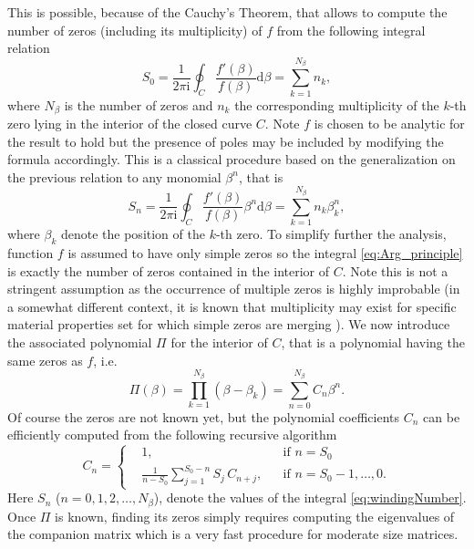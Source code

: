 \documentclass[a4paper,10pt]{article}
\newcommand{\ud}{\mathrm{d}}
\renewcommand{\i}{\mathrm{i}}
\begin{document}
This is possible, because of the Cauchy's Theorem, that allows to compute the number of zeros (including its multiplicity) of $f$  from the following integral relation
\begin{equation}
    \label{eq:Arg_principle}
 S_0 = \frac{1}{2\pi \i} \oint_C \frac{f'(\beta)}{f(\beta)}  \ud \beta =
 \sum_{k=1}^{N_\beta} n_{k},
\end{equation}
where $N_\beta$ is the number of zeros and $n_{k}$ the corresponding multiplicity of the $k$-th
zero lying in the interior of the closed curve $C$. Note $f$ is chosen to be analytic
for the result to hold but the presence of poles may be included
by modifying the formula accordingly.
This is a classical procedure based
on the generalization on the previous relation to any monomial $\beta^n$, that is
~\cite{Kravanja:2000}
\begin{equation}
    \label{eq:windingNumber}
S_n = \frac{1}{2\pi \i} \oint_C \frac{f'(\beta)}{f(\beta)} \beta^n \ud \beta =
 \sum_{k=1}^{N_\beta} n_{k} \beta_{k}^n,
\end{equation}
where $\beta_{k}$ denote the position of the $k$-th zero.
To simplify further the analysis, function $f$ is assumed to
have only simple zeros so the integral \eqref{eq:Arg_principle} is exactly the number of zeros contained in the interior of $C$. Note this is not a stringent assumption as the occurrence of multiple zeros is highly improbable
(in a somewhat different context, it is known that multiplicity may exist
for specific material properties set for which simple zeros are merging \cite{Nilsson:1980,Bloch3D:20107}).
We now introduce the associated polynomial $\Pi$ for the interior of $C$, that is
a polynomial having the same zeros as $f$, i.e.
\begin{equation}
\label{eq:Pi}
    \Pi(\beta) = \prod_{k=1}^{N_\beta} ( \beta - \beta_{k}) = \sum_{n=0}^{N_\beta} C_n \beta^n.
\end{equation}
Of course the zeros are not known yet, but the polynomial coefficients $C_n$
can be efficiently computed from the following recursive algorithm~\cite{Cristini:1994,Chen:2000}
\begin{equation}
    \label{eq:Cn}
    C_n = \left\{ \begin{aligned}
    &1, &        & \text{if } n=S_0\\
  &\frac{1}{n-S_0}\sum_{j=1}^{S_0-n} S_j \,  C_{n+j},     &   & \text{if } n = S_0-1, \ldots, 0.
    \end{aligned} \right.
\end{equation}
Here $S_n$ ($n=0,1,2,\ldots,N_\beta$), denote the values of the integral \eqref{eq:windingNumber}.
Once $\Pi$ is known, finding its zeros simply requires computing  the eigenvalues of the companion matrix which is a very fast procedure for moderate size matrices.
\end{document}

